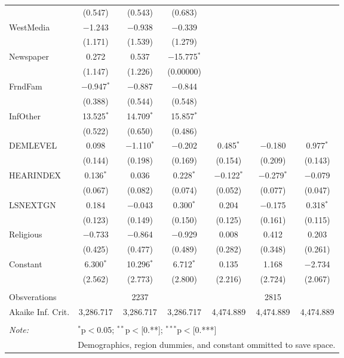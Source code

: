 \begin{table}[!htbp]
\begin{tabular}{@{\extracolsep{1pt}}lcccccc}
  & (0.547) & (0.543) & (0.683) &  &  &  \\ 
  WestMedia & $-$1.243 & $-$0.938 & $-$0.339 &  &  &  \\ 
  & (1.171) & (1.539) & (1.279) &  &  &  \\ 
  Newspaper & 0.272 & 0.537 & $-$15.775$^{*}$ &  &  &  \\ 
  & (1.147) & (1.226) & (0.00000) &  &  &  \\ 
  FrndFam & $-$0.947$^{*}$ & $-$0.887 & $-$0.844 &  &  &  \\ 
  & (0.388) & (0.544) & (0.548) &  &  &  \\ 
  InfOther & 13.525$^{*}$ & 14.709$^{*}$ & 15.857$^{*}$ &  &  &  \\ 
  & (0.522) & (0.650) & (0.486) &  &  &  \\ 
  DEMLEVEL & 0.098 & $-$1.110$^{*}$ & $-$0.202 & 0.485$^{*}$ & $-$0.180 & 0.977$^{*}$ \\ 
  & (0.144) & (0.198) & (0.169) & (0.154) & (0.209) & (0.143) \\ 
  HEARINDEX & 0.136$^{*}$ & 0.036 & 0.228$^{*}$ & $-$0.122$^{*}$ & $-$0.279$^{*}$ & $-$0.079 \\ 
  & (0.067) & (0.082) & (0.074) & (0.052) & (0.077) & (0.047) \\ 
  LSNEXTGN & 0.184 & $-$0.043 & 0.300$^{*}$ & 0.204 & $-$0.175 & 0.318$^{*}$ \\ 
  & (0.123) & (0.149) & (0.150) & (0.125) & (0.161) & (0.115) \\ 
  Religious & $-$0.733 & $-$0.864 & $-$0.929 & 0.008 & 0.412 & 0.203 \\ 
  & (0.425) & (0.477) & (0.489) & (0.282) & (0.348) & (0.261) \\ 
  Constant & 6.300$^{*}$ & 10.296$^{*}$ & 6.712$^{*}$ & 0.135 & 1.168 & $-$2.734 \\ 
  & (2.562) & (2.773) & (2.800) & (2.216) & (2.724) & (2.067) \\ 
 \hline \\[-1.8ex] 
Obsverations &  & 2237 &  &  & 2815 &  \\ 
Akaike Inf. Crit. & 3,286.717 & 3,286.717 & 3,286.717 & 4,474.889 & 4,474.889 & 4,474.889 \\ 
\hline 
\hline \\[-1.8ex] 
\textit{Note:}  & \multicolumn{6}{l}{$^{*}$p$<$0.05; $^{**}$p$<$[0.**]; $^{***}$p$<$[0.***]} \\ 
 & \multicolumn{6}{l}{Demographics, region dummies, and constant ommitted to save space.} \\ 
\end{tabular} 
\end{table} 
